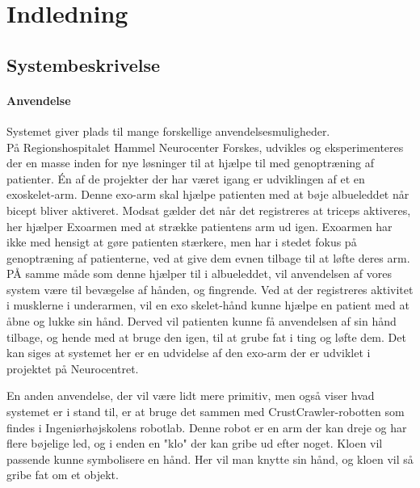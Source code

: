 \thispagestyle{fancy}
\chapter{Indledning}
\label{chp:indledning}

\section{Systembeskrivelse}
\subsubsection{Anvendelse}
Systemet giver plads til mange forskellige anvendelsesmuligheder.\\

På Regionshospitalet Hammel Neurocenter Forskes, udvikles og eksperimenteres der en masse inden for nye løsninger til at hjælpe til med genoptræning af patienter. Én af de projekter der har været igang er udviklingen af et en exoskelet-arm. Denne exo-arm skal hjælpe patienten med at bøje albueleddet når bicept bliver aktiveret. Modsat gælder det når det registreres at triceps aktiveres, her hjælper Exoarmen med at strække patientens arm ud igen. Exoarmen har ikke med hensigt at gøre patienten stærkere, men har i stedet fokus på genoptræning af patienterne, ved at give dem evnen tilbage til at løfte deres arm. PÅ samme måde som denne hjælper til i albueleddet, vil anvendelsen af vores system være til bevægelse af hånden, og fingrende. Ved at der registreres aktivitet i musklerne i underarmen, vil en exo skelet-hånd kunne hjælpe en patient med at åbne og lukke sin hånd. Derved vil patienten kunne få anvendelsen af sin hånd tilbage, og hende med at bruge den igen, til at grube fat i ting og løfte dem. Det kan siges at systemet her er en udvidelse af den exo-arm der er udviklet i projektet på Neurocentret.

En anden anvendelse, der vil være lidt mere primitiv, men også viser hvad systemet er i stand til, er at bruge det sammen med CrustCrawler-robotten som findes i Ingeniørhøjskolens robotlab. Denne robot er en arm der kan dreje og har flere bøjelige led, og i enden en "klo" der kan gribe ud efter noget. Kloen vil passende kunne symbolisere en hånd. Her vil man knytte sin hånd, og kloen vil så gribe fat om et objekt.
